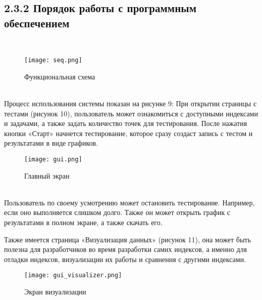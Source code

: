 \subsection{2.3.2 Порядок работы с программным обеспечением}
  \\
\begin{figure}[h]
    \centering
    \texttt{[image: seq.png]}
    \caption{Функциональная схема}
\end{figure}
  \\
Процесс использования системы показан на рисунке 9: При открытии страницы с тестами (рисунок 10), пользователь может ознакомиться с доступными индексами и задачами, а также задать количество точек для тестирования. После нажатия кнопки «Старт» начнется тестирование, которое сразу создаст запись с тестом и результатами в виде графиков. 
  \\
\begin{figure}[h]
    \centering
    \texttt{[image: gui.png]}
    \caption{Главный экран}
\end{figure}
  \\
Пользователь по своему усмотрению может остановить тестирование. Например, если оно выполняется слишком долго. Также он может открыть график с результатами в полном экране, а также скачать его. 

Также имеется страница «Визуализация данных» (рисунок 11), она может быть полезна для разработчиков во время разработки самих индексов, а именно для отладки индексов, визуализации их работы и сравнения с другими индексами. 
\begin{figure}[h]
    \centering
    \texttt{[image: gui\_visualizer.png]}
    \caption{Экран визуализации}
\end{figure}
